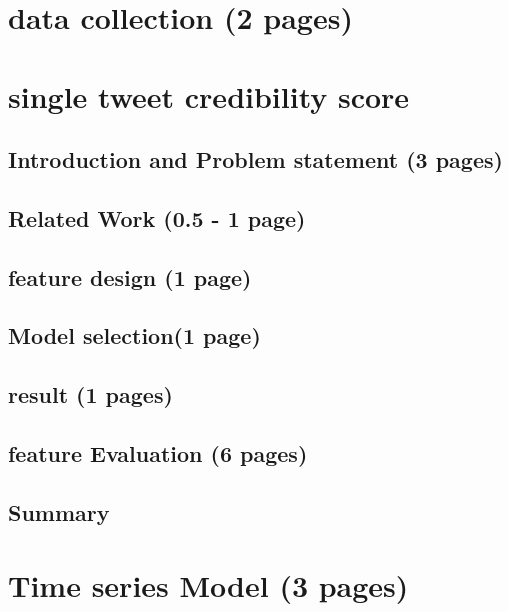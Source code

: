 \documentclass[12pt]{article}
\begin{document}
	

 

\newpage
\section{data collection (2 pages)}

\section{single tweet credibility score  }
	
	\subsection{Introduction and Problem statement (3 pages)}
	
	\subsection{Related Work (0.5 - 1 page)}
	
	\subsection{feature design (1 page)}

	\subsection{Model selection(1 page)}

 

 
	\subsection{result  (1 pages)}
 

 	\subsection{feature Evaluation (6 pages)}

	\subsection{Summary}


\newpage
\section{Time series Model  (3 pages)}
\end{document}
